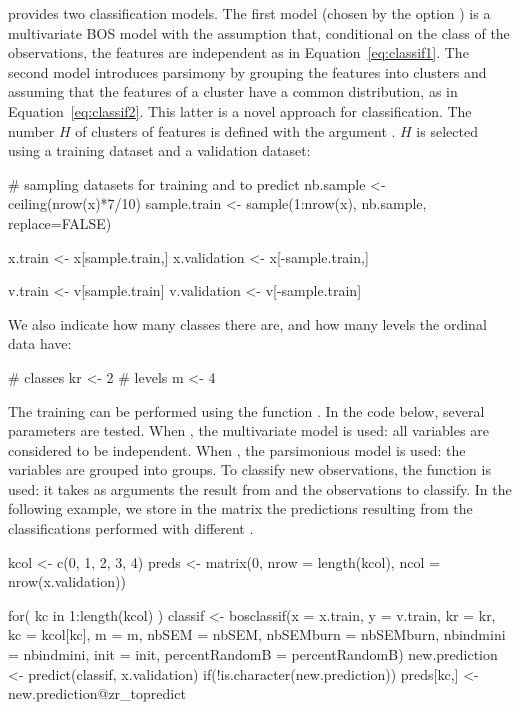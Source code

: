 \noindent {} provides two classification models. The first model (chosen by the option ) is a multivariate BOS model with the assumption that, conditional on the class of the observations, the features are independent as in Equation~\ref{eq:classif1}. The second model introduces parsimony by grouping the features into clusters and assuming that the features of a cluster have a common distribution, as in Equation~\ref{eq:classif2}. This latter is a novel approach for classification. The number $H$ of clusters of features is defined with the argument . $H$ is selected using a training dataset and a validation dataset:

\begin{example}
# sampling datasets for training and to predict
nb.sample <- ceiling(nrow(x)*7/10)
sample.train <- sample(1:nrow(x), nb.sample, replace=FALSE)

x.train <- x[sample.train,]
x.validation <- x[-sample.train,]

v.train <- v[sample.train]
v.validation <- v[-sample.train]
\end{example}

We also indicate how many classes there are, and how many levels the ordinal data have:
\begin{example}
# classes
kr <- 2
# levels
m <- 4
\end{example}

\noindent The training can be performed using the function . In the code below, several  parameters are tested. When , the multivariate model is used: all variables are considered to be independent. When , the parsimonious model is used: the variables are grouped into  groups. To classify new observations, the  function is used: it takes as arguments the result from  and the observations to classify. In the following example, we store in the  matrix the predictions resulting from the classifications performed with different .
\begin{example}
kcol <- c(0, 1, 2, 3, 4)
preds <- matrix(0, nrow = length(kcol), ncol = nrow(x.validation))

for( kc in 1:length(kcol) ){
  classif <- bosclassif(x = x.train, y = v.train, kr = kr, kc = kcol[kc],
                m = m, nbSEM = nbSEM, nbSEMburn = nbSEMburn, 
                nbindmini = nbindmini, init = init,
                percentRandomB = percentRandomB)
  new.prediction <- predict(classif, x.validation)
  if(!is.character(new.prediction)){
       preds[kc,] <- new.prediction@zr_topredict
  }
}
\end{example}

